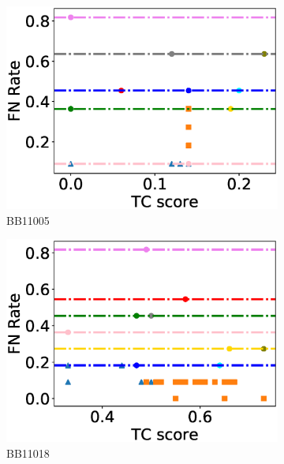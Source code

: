 \begin{figure}[!htbp]
\begin{adjustwidth}{-1cm}{-1cm}
\begin{subfigure}{0.26\textwidth}
			\includegraphics[width=\columnwidth]{Figure/summary/precomputedInit/Balibase/BB11005_fnrate_vs_tc_2}
			\caption{BB11005}
\end{subfigure}    
		\begin{subfigure}{0.26\textwidth}
			\includegraphics[width=\columnwidth]{Figure/summary/precomputedInit/Balibase/BB11018_fnrate_vs_tc_2}
			\caption{BB11018}
\end{subfigure}
		\begin{subfigure}{0.26\textwidth}

\end{subfigure}
\end{adjustwidth}
\end{figure}
